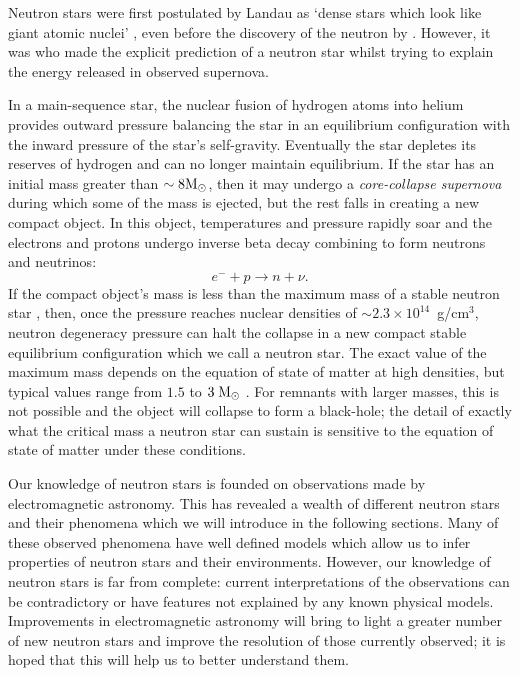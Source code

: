 \documentclass[../full_thesis/full_thesis.tex]{subfiles}
\begin{document}
 

Neutron stars were first postulated by Landau as `dense stars
which look like giant atomic nuclei' \citep{Yakovlev2013}, even before the
discovery of the neutron by \citet{Chadwick1932}. However, it was
\citet{Baade1934} who made the explicit prediction of a neutron star whilst
trying to explain the energy released in observed supernova.

In a main-sequence star, the nuclear fusion of
hydrogen atoms into helium provides outward pressure balancing the star in an
equilibrium configuration with the inward pressure of the star's self-gravity.
Eventually the star depletes its reserves of hydrogen and can no longer
maintain equilibrium. If the star has an initial mass greater than $\sim 8
\rm M_{\odot}$, then it may undergo a \emph{core-collapse supernova} during which some
of the mass is ejected, but the rest falls in creating a new compact object.
In this object, temperatures and pressure rapidly soar and the
electrons and protons undergo inverse beta decay combining to form neutrons and
neutrinos:
\begin{equation}
    e^{-} + p \rightarrow n + \nu.
\end{equation}
If the compact object's mass is less than the maximum
mass of a stable neutron star \citep{oppenheimer1939massive},
then, once the pressure
reaches nuclear densities of $\sim 2.3 \times10^{14}$~g/cm$^{3}$, neutron
degeneracy pressure can halt the collapse in a new compact stable equilibrium
configuration which we call a neutron star. The exact value of the maximum
mass
depends on the equation of state of matter at high densities, but typical values
range from $1.5$ to $3\;\rm M_{\odot}$ \citep{bombaci1996}.
For remnants with larger masses,
this is not possible and the object will collapse to form a black-hole; the
detail of exactly what the critical mass a neutron star can sustain is
sensitive to the equation of state of matter under these conditions.

Our knowledge of neutron stars is founded on observations made by
electromagnetic astronomy. This has revealed a wealth of different neutron
stars and their phenomena which we will introduce in the following sections.
Many of these observed phenomena have well defined models which allow us to
infer properties of neutron stars and their environments.  However, our
knowledge of neutron stars is far from complete: current interpretations of the
observations can be contradictory or have features not explained by any known
physical models. Improvements in electromagnetic astronomy will bring to light
a greater number of new neutron stars and improve the resolution of those
currently observed; it is hoped that this will help us to better understand
them.
\end{document}

